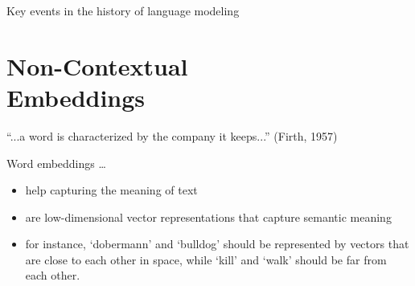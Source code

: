 \documentclass[compress]{beamer}
\begin{document}
\begin{frame}{Key events in the history of language modeling}
\end{frame}


\section{Non-Contextual \\Embeddings}

\begin{frame}{``...a word is characterized by the company it keeps...'' (Firth, 1957)}
	\begin{block}{Word embeddings \ldots}
		\begin{itemize}
			\item help capturing the meaning of text
			\item are low-dimensional vector representations that capture semantic meaning
			\item for instance, `dobermann' and `bulldog' should be represented by vectors that are close to each other in space, while `kill' and `walk' should be far from each other.
		\end{itemize}
	\end{block}
\end{frame}
\end{document}
